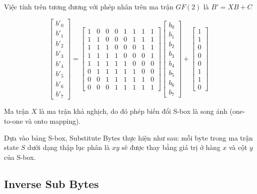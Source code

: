 Việc tính trên tương đương với phép nhân trên ma trận $GF(2)$ là $B' = XB + C$

\[ \begin{bmatrix}
    b'_0 \\ b'_1 \\ b'_2 \\ b'_3 \\ b'_4 \\ b'_5 \\ b'_6 \\ b'_7
\end{bmatrix} = 
\begin{bmatrix}
    1 & 0 & 0 & 0 & 1 & 1 & 1 & 1 \\
    1 & 1 & 0 & 0 & 0 & 1 & 1 & 1 \\
    1 & 1 & 1 & 0 & 0 & 0 & 1 & 1 \\
    1 & 1 & 1 & 1 & 0 & 0 & 0 & 1 \\
    1 & 1 & 1 & 1 & 1 & 0 & 0 & 0 \\
    0 & 1 & 1 & 1 & 1 & 1 & 0 & 0 \\
    0 & 0 & 1 & 1 & 1 & 1 & 1 & 0 \\
    0 & 0 & 0 & 1 & 1 & 1 & 1 & 1
\end{bmatrix} 
\begin{bmatrix}
    b_0 \\ b_1 \\ b_2 \\ b_3 \\ b_4 \\ b_5 \\ b_6 \\ b_7
\end{bmatrix} + 
\begin{bmatrix}
    1 \\ 1 \\ 0 \\ 0 \\ 0 \\ 1 \\ 1 \\ 0
\end{bmatrix}\]

Ma trận $X$ là ma trận khả nghịch, do đó phép biến đổi S-box là song ánh (one-to-one và onto mapping).

Dựa vào bảng S-box, Substitute Bytes thực hiện như sau: mỗi byte trong ma trận state $S$ dưới dạng thập lục phân là $xy$ sẽ được thay bằng giá trị ở hàng $x$ và cột $y$ của S-box.

\subsection{Inverse Sub Bytes}

